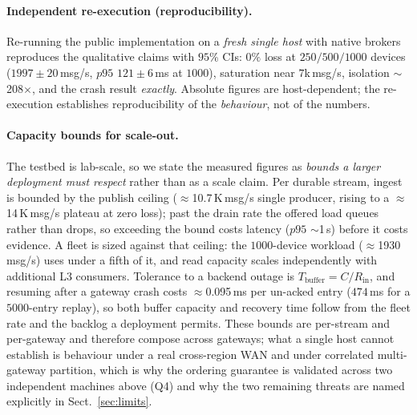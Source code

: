 \documentclass[runningheads]{llncs}
\begin{document}
\paragraph{Independent re-execution (reproducibility).}
Re-running the public implementation on a \emph{fresh single host} with native brokers
reproduces the qualitative claims with $95\%$ CIs: $0\%$ loss at $250/500/1000$ devices
($1997\pm20$\,msg/s, $p95$ $121\pm6$\,ms at $1000$), saturation near $7$k\,msg/s, isolation
$\sim$208$\times$, and the crash result \emph{exactly}. Absolute figures are host-dependent; the re-execution establishes
reproducibility of the \emph{behaviour}, not of the numbers.

\paragraph{Capacity bounds for scale-out.}
The testbed is lab-scale, so we state the measured figures as \emph{bounds a larger
deployment must respect} rather than as a scale claim. Per durable stream, ingest is
bounded by the publish ceiling ($\approx$10.7\,K\,msg/s single producer, rising to a
$\approx$14\,K\,msg/s plateau at zero loss); past the drain rate the offered load queues
rather than drops, so exceeding the bound costs latency ($p95$ $\sim$1\,s) before it costs
evidence. A fleet is sized against that ceiling: the $1000$-device workload
($\approx$1930\,msg/s) uses under a fifth of it, and read capacity scales independently
with additional L3 consumers. Tolerance to a backend outage is
$T_{\text{buffer}}=C/R_{\text{in}}$, and resuming after a gateway crash costs
$\approx$0.095\,ms per un-acked entry ($474$\,ms for a $5000$-entry replay), so both buffer
capacity and recovery time follow from the fleet rate and the backlog a deployment
permits. These bounds are per-stream and per-gateway and therefore compose across
gateways; what a single host cannot establish is behaviour under a real cross-region WAN
and under correlated multi-gateway partition, which is why the ordering guarantee is
validated across two independent machines above (Q4) and why the two remaining threats
are named explicitly in Sect.~\ref{sec:limits}.

\end{document}
